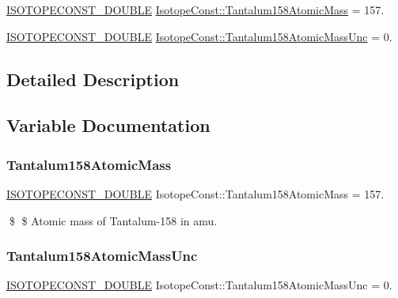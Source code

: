 \begin{DoxyCompactItemize}
\item 
\mbox{\hyperlink{group___isotope_const-_macros_ga8f45a7272ce02c0b4c65c44636ed719a}{I\+S\+O\+T\+O\+P\+E\+C\+O\+N\+S\+T\+\_\+\+D\+O\+U\+B\+LE}} \mbox{\hyperlink{group___isotope_const-_tantalum-_ta158_ga578f24c57221678ea411a718a39825f2}{Isotope\+Const\+::\+Tantalum158\+Atomic\+Mass}} = 157.
\item 
\mbox{\hyperlink{group___isotope_const-_macros_ga8f45a7272ce02c0b4c65c44636ed719a}{I\+S\+O\+T\+O\+P\+E\+C\+O\+N\+S\+T\+\_\+\+D\+O\+U\+B\+LE}} \mbox{\hyperlink{group___isotope_const-_tantalum-_ta158_ga87397188b2a8e8b06d73504f6bc6b867}{Isotope\+Const\+::\+Tantalum158\+Atomic\+Mass\+Unc}} = 0.
\end{DoxyCompactItemize}


\subsection{Detailed Description}


\subsection{Variable Documentation}
\mbox{\label{group___isotope_const-_tantalum-_ta158_ga578f24c57221678ea411a718a39825f2}} 
\subsubsection{\texorpdfstring{Tantalum158\+Atomic\+Mass}{Tantalum158AtomicMass}}
{\footnotesize\ttfamily \mbox{\hyperlink{group___isotope_const-_macros_ga8f45a7272ce02c0b4c65c44636ed719a}{I\+S\+O\+T\+O\+P\+E\+C\+O\+N\+S\+T\+\_\+\+D\+O\+U\+B\+LE}} Isotope\+Const\+::\+Tantalum158\+Atomic\+Mass = 157.}

\$ \$ Atomic mass of Tantalum-\/158 in amu. \mbox{\label{group___isotope_const-_tantalum-_ta158_ga87397188b2a8e8b06d73504f6bc6b867}} 
\subsubsection{\texorpdfstring{Tantalum158\+Atomic\+Mass\+Unc}{Tantalum158AtomicMassUnc}}
{\footnotesize\ttfamily \mbox{\hyperlink{group___isotope_const-_macros_ga8f45a7272ce02c0b4c65c44636ed719a}{I\+S\+O\+T\+O\+P\+E\+C\+O\+N\+S\+T\+\_\+\+D\+O\+U\+B\+LE}} Isotope\+Const\+::\+Tantalum158\+Atomic\+Mass\+Unc = 0.}


